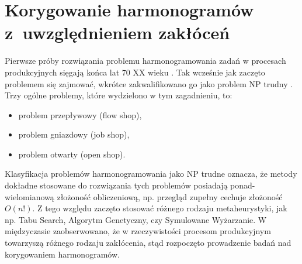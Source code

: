 \documentclass[archivemode]{mgr}
\begin{document}
\chapter{Korygowanie harmonogramów z~uwzględnieniem zakłóceń \label{ch_lit_rev}}
Pierwsze próby rozwiązania problemu harmonogramowania zadań w procesach produkcyjnych sięgają końca lat 70 XX wieku \cite{Garey76}. Tak wcześnie jak zaczęto problemem się zajmować, wkrótce zakwalifikowano go jako problem NP trudny \cite{Garey76, Nawaz83}. Trzy ogólne problemy, które wydzielono w tym zagadnieniu, to:
\begin{itemize}
    \item problem przepływowy (flow shop),
    \item problem gniazdowy (job shop),
    \item problem otwarty (open shop).
\end{itemize}
Klasyfikacja problemów harmonogramowania jako NP trudne oznacza, że metody dokładne stosowane do rozwiązania tych problemów posiadają ponad-wielomianową złożoność obliczeniową, np. przegląd zupełny cechuje złożoność $O(n!)$. Z tego względu zaczęto stosować różnego rodzaju metaheurystyki, jak np. Tabu Search, Algorytm Genetyczny, czy Symulowane Wyżarzanie. W międzyczasie zaobserwowano, że w rzeczywistości procesom produkcyjnym towarzyszą różnego rodzaju zakłócenia, stąd rozpoczęto prowadzenie badań nad korygowaniem harmonogramów.
%
\end{document}
